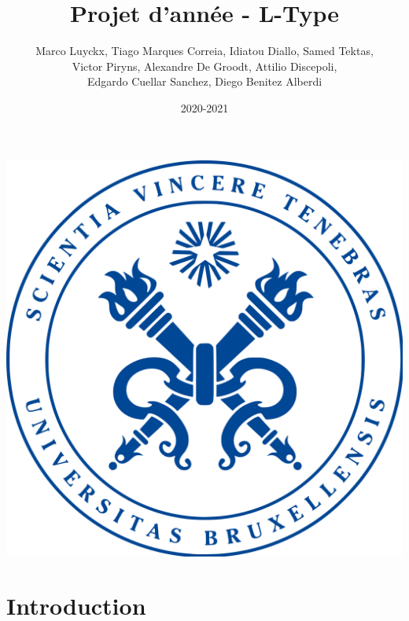 \documentclass[french]{article}
\title{Projet d'année - L-Type}
\author{Marco Luyckx, Tiago Marques Correia, Idiatou Diallo, Samed Tektas,
\\Victor Piryns, Alexandre De Groodt, Attilio Discepoli, 
\\Edgardo Cuellar Sanchez, Diego Benitez Alberdi}
\date{2020-2021}
\begin{document}
\maketitle
\begin{center}
    \includegraphics[scale=0.2]{assets/ULB.png}
\end{center}
\newpage
\tableofcontents
\pagebreak
\section{Introduction}
\end{document}
